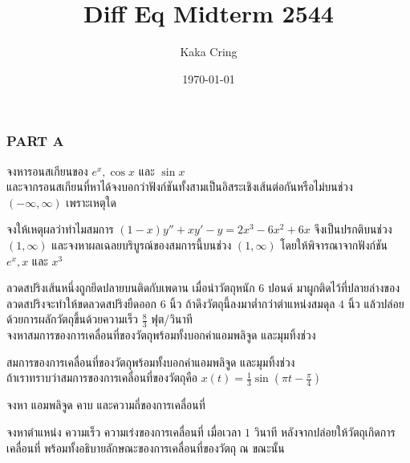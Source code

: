 \documentclass[12pt,final]{novelette} %
\title{Diff Eq Midterm 2544}
\author{Kaka Cring}
\date{\today}
\begin{document}

\subsubsection*{PART A}

\begin{question}
    \item {}
    จงหารอนสเกียนของ $e^x, \cos x$ และ $\sin x$ \\
    และจากรอนสเกียนที่หาได้จงบอกว่าฟังก์ชันทั้งสามเป็นอิสระเชิงเส้นต่อกันหรือไม่บนช่วง $(-\infty, \infty)$ เพราะเหตุใด 



    \item {}
    จงให้เหตุผลว่าทําไมสมการ $(1-x)y'' + xy' - y = 2x^3 - 6x^2 + 6x$ จึงเป็นปรกติบนช่วง $(1, \infty)$
    และจงหาผลเฉลยบริบูรณ์ของสมการนี้บนช่วง $(1, \infty)$ โดยให้พิจารณาจากฟังก์ชัน $e^x, x$ และ $x^3$ 



    \item {}
    ลวดสปริงเส้นหนึ่งถูกยึดปลายบนติดกับเพดาน
    เมื่อนําวัตถุหนัก $6$ ปอนด์ มาผูกติดไว้ที่ปลายล่างของลวดสปริงจะทําให้ขดลวดสปริงยืดออก $6$ นิ้ว
    ถ้าดึงวัตถุนี้ลงมาต่ำกว่าตำแหน่งสมดุล $4$ นิ้ว แล้วปล่อยด้วยการผลักวัตถุขึ้นด้วยความเร็ว $\frac83$ ฟุต/วินาที \\
    จงหาสมการของการเคลื่อนที่ของวัตถุพร้อมทั้งบอกค่าแอมพลิจูด และมุมทิ้งช่วง 



    \item {}
    สมการของการเคลื่อนที่ของวัตถุพร้อมทั้งบอกค่าแอมพลิจูด และมุมทิ้งช่วง \\
    ถ้าเราทราบว่าสมการของการเคลื่อนที่ของวัตถุคือ $x(t) = \frac13 \sin(\pi t - \frac\pi4)$
    \begin{question}
        \item
        จงหา แอมพลิจูด คาบ และความถี่ของการเคลื่อนที่ 



        \item
        จงหาตําแหน่ง ความเร็ว ความเร่งของการเคลื่อนที่ เมื่อเวลา $1$ วินาที หลังจากปล่อยให้วัตถุเกิดการเคลื่อนที่
        พร้อมทั้งอธิบายลักษณะของการเคลื่อนที่ของวัตถุ ณ ขณะนั้น 


    \end{question}
\end{question}
\end{document}
